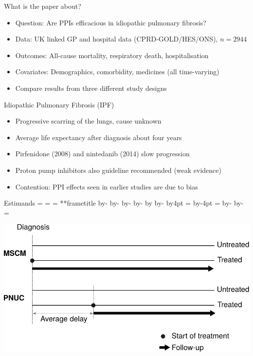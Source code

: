 \documentclass[aspectratio=169,12pt]{beamer} %
\makeatletter
\newif\ifsidebartheme
\newcommand*{\calculatespace}{%
    \contentheight=\paperheight%
    \ifx\beamer@frametitle\@empty%
        \setbox\@tempboxa=\box\voidb@x%
      \else%
        \setbox\@tempboxa=\vbox{%
          \vbox{}%
          {\parskip0pt\usebeamertemplate***{frametitle}}%
        }%
        \ifsidebartheme%
          \advance\contentheight by-1em%
        \fi%
      \fi%
    \advance\contentheight by-\ht\@tempboxa%
    \advance\contentheight by-\dp\@tempboxa%
    \advance\contentheight by-\beamer@frametopskip%
    \ifbeamer@plainframe%
    \contentbottom=0pt%
    \else%
    \advance\contentheight by-\headheight%
    \advance\contentheight by\headdp%
    \advance\contentheight by-\footheight%
    \advance\contentheight by4pt%
    \contentbottom=\footheight%
    \advance\contentbottom by-4pt%
    \fi%
    \contentwidth=\paperwidth%
    \ifbeamer@plainframe%
    \contentleft=0pt%
    \else%
    \advance\contentwidth by-\beamer@rightsidebar%
    \advance\contentwidth by-\beamer@leftsidebar\relax%
    \contentleft=\beamer@leftsidebar%
    \fi%
}
\makeatother
\begin{document}
\begin{frame}{What is the paper about?}
    \begin{itemize}
	\item Question: Are PPIs efficacious in idiopathic pulmonary fibrosis?
	\item Data: UK linked GP and hospital data (CPRD-GOLD/HES/ONS), $n=2944$
	\item Outcomes: All-cause mortality, respiratory death, hospitalisation
	\item Covariates: Demographics, comorbidity, medicines (all time-varying)
	\item Compare results from three different study designs
    \end{itemize}
\end{frame}

\begin{frame}{Idiopathic Pulmonary Fibrosis (IPF)}
    \begin{itemize}
        \item Progressive scarring of the lungs, cause unknown
	\item Average life expectancy after diagnosis about four years
	\item Pirfenidone (2008) and nintedanib (2014) slow progression
	\item Proton pump inhibitors also guideline recommended (weak evidence)
	\item Contention: PPI effects seen in earlier studies are due to bias
    \end{itemize}
\end{frame}

\begin{frame}{Estimands}
    \calculatespace%
    \begin{center}
	\includegraphics[height=0.95\contentheight]{ref/estimands.pdf}
    \end{center}
\end{frame}
\end{document}
